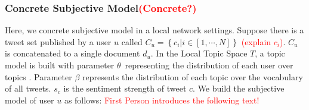 \documentclass{acm_proc_article-sp}
\newcommand{\mo}[1]{\textcolor{red}{#1}}
\begin{document}
\subsubsection{Concrete Subjective Model\mo{(Concrete?)}}
\label{concrete}
Here, we concrete subjective model in a local network settings. 
Suppose there is a tweet set published by a user $ u $ called $ C_{u}=\left\lbrace c_{i} \vert i \in \left[ 1, \cdots, N \right]  \right\rbrace$ \mo{(explain $c_i$)}. $ C_{u} $ is concatenated to a single document $ d_{u} $.
In the Local Topic Space $ T $, a topic model is built with parameter $ \theta $\ representing the distribution of each user over topics . Parameter $ \beta $ represents the distribution of each topic over the vocabulary of all tweets. $ s_{c} $ is the sentiment strength of tweet $ c $.
We build the subjective model of user $ u $ as follows: \mo{First Person introduces the following text!}
\end{document}
